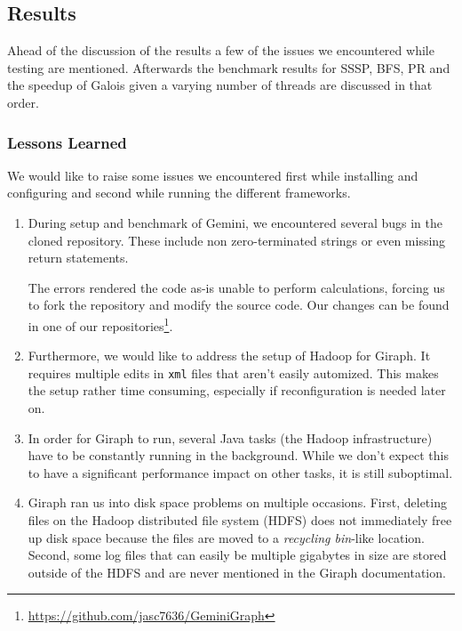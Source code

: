 
\subsection{Results}
Ahead of the discussion of the results a few of the issues we encountered while testing are mentioned. Afterwards the benchmark results for SSSP, BFS, PR and the speedup of Galois given a varying number of threads are discussed in that order.


\subsubsection{Lessons Learned}


We would like to raise some issues we encountered first while installing and configuring and second while running the different frameworks.

\begin{enumerate}
	\item During setup and benchmark of Gemini, we encountered several bugs in the cloned repository. These include non zero-terminated strings or even missing return statements.

	The errors rendered the code as-is unable to perform calculations, forcing us to fork the repository and modify the source code. Our changes can be found in one of our repositories\footnote{\url{https://github.com/jasc7636/GeminiGraph}}.

	\item Furthermore, we would like to address the setup of Hadoop for Giraph. It requires multiple edits in \texttt{xml} files that aren't easily automized. This makes the setup rather time consuming, especially if reconfiguration is needed later on.
	\item In order for Giraph to run, several Java tasks (the Hadoop infrastructure) have to be constantly running in the background. While we don't expect this to have a significant performance impact on other tasks, it is still suboptimal.
	\item Giraph ran us into disk space problems on multiple occasions. First, deleting files on the Hadoop distributed file system (HDFS) does not immediately free up disk space because the files are moved to a \emph{recycling bin}-like location. Second, some log files that can easily be multiple gigabytes in size are stored outside of the HDFS and are never mentioned in the Giraph documentation.
\end{enumerate}


